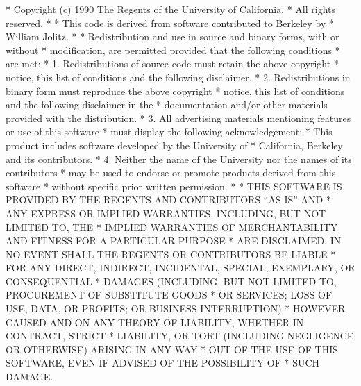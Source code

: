\begin{copyrightEnv}
 * Copyright (c) 1990 The Regents of the University of California.
 * All rights reserved.
 *
 * This code is derived from software contributed to Berkeley by
 * William Jolitz.
 *
 * Redistribution and use in source and binary forms, with or without
 * modification, are permitted provided that the following conditions
 * are met:
 * 1. Redistributions of source code must retain the above copyright
 *    notice, this list of conditions and the following disclaimer.
 * 2. Redistributions in binary form must reproduce the above copyright
 *    notice, this list of conditions and the following disclaimer in the
 *    documentation and/or other materials provided with the distribution.
 * 3. All advertising materials mentioning features or use of this software
 *    must display the following acknowledgement:
 *	This product includes software developed by the University of
 *	California, Berkeley and its contributors.
 * 4. Neither the name of the University nor the names of its contributors
 *    may be used to endorse or promote products derived from this software
 *    without specific prior written permission.
 *
 * THIS SOFTWARE IS PROVIDED BY THE REGENTS AND CONTRIBUTORS ``AS IS'' AND
 * ANY EXPRESS OR IMPLIED WARRANTIES, INCLUDING, BUT NOT LIMITED TO, THE
 * IMPLIED WARRANTIES OF MERCHANTABILITY AND FITNESS FOR A PARTICULAR PURPOSE
 * ARE DISCLAIMED.  IN NO EVENT SHALL THE REGENTS OR CONTRIBUTORS BE LIABLE
 * FOR ANY DIRECT, INDIRECT, INCIDENTAL, SPECIAL, EXEMPLARY, OR CONSEQUENTIAL
 * DAMAGES (INCLUDING, BUT NOT LIMITED TO, PROCUREMENT OF SUBSTITUTE GOODS
 * OR SERVICES; LOSS OF USE, DATA, OR PROFITS; OR BUSINESS INTERRUPTION)
 * HOWEVER CAUSED AND ON ANY THEORY OF LIABILITY, WHETHER IN CONTRACT, STRICT
 * LIABILITY, OR TORT (INCLUDING NEGLIGENCE OR OTHERWISE) ARISING IN ANY WAY
 * OUT OF THE USE OF THIS SOFTWARE, EVEN IF ADVISED OF THE POSSIBILITY OF
 * SUCH DAMAGE.
\end{copyrightEnv}

